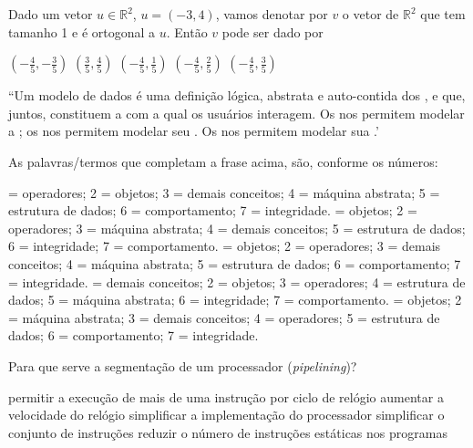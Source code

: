 \documentclass[12pt, addpoints]{exam}
\begin{document}
\begin{questions}
\question
Dado um vetor \( u \in \mathbb{R}^2 \), \( u = (-3, 4) \), vamos denotar por \( v \) o vetor de \( \mathbb{R}^2 \) que tem tamanho 1 e é ortogonal a \( u \). Então \( v \) pode ser dado por

\begin{choices}
\choice \( \left( -\frac{4}{5}, -\frac{3}{5} \right) \)
\choice \( \left( \frac{3}{5}, \frac{4}{5} \right) \)
\choice \( \left( -\frac{4}{5}, \frac{1}{5} \right) \)
\choice \( \left( -\frac{4}{5}, \frac{2}{5} \right) \)
\choice \( \left( -\frac{4}{5}, \frac{3}{5} \right) \)
\end{choices}

\question
``Um modelo de dados é uma definição lógica, abstrata e auto-contida
dos ,  e  que, juntos, constituem a 
com a qual os usuários interagem. Os  nos permitem modelar
a ; os  nos permitem modelar
seu . Os  nos permitem modelar sua .'

As palavras/termos que completam a frase acima, são, conforme os números:

\begin{choices}
 = operadores; 2 = objetos; 3 = demais conceitos; 4 = máquina abstrata; 5 = estrutura de dados; 6 = comportamento; 7 = integridade.
 = objetos; 2 = operadores; 3 = máquina abstrata; 4 = demais conceitos; 5 = estrutura de dados; 6 = integridade; 7 = comportamento.
 = objetos; 2 = operadores; 3 = demais conceitos; 4 = máquina abstrata; 5 = estrutura de dados; 6 = comportamento; 7 = integridade.
 = demais conceitos; 2 = objetos; 3 = operadores; 4 = estrutura de dados; 5 = máquina abstrata; 6 = integridade; 7 = comportamento.
 = objetos; 2 = máquina abstrata; 3 = demais conceitos; 4 = operadores; 5 = estrutura de dados; 6 = comportamento; 7 = integridade.
\end{choices}

\question
Para que serve a segmentação de um processador (\textit{pipelining})?
\begin{choices}
\choice permitir a execução de mais de uma instrução por ciclo de relógio
\choice aumentar a velocidade do relógio
\choice simplificar a implementação do processador
\choice simplificar o conjunto de instruções
\choice reduzir o número de instruções estáticas nos programas
\end{choices}



    \end{questions}
    
\end{document}
